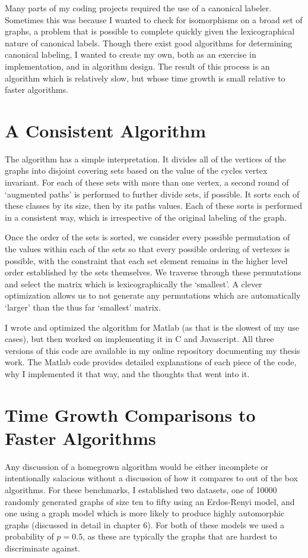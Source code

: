 \documentclass[11pt,a4paper]{report}
\begin{document}
Many parts of my coding projects required the use of a canonical labeler.
Sometimes this was because I wanted to check for isomorphisms on a broad set of graphs, a problem that is possible to complete quickly given the lexicographical nature of canonical labels.
Though there exist good algorithms for determining canonical labeling, I wanted to create my own, both as an exercise in implementation, and in algorithm design.
The result of this process is an algorithm which is relatively slow, but whose time growth is small relative to faster algorithms.

\section{A Consistent Algorithm}
The algorithm has a simple interpretation. 
It divides all of the vertices of the graphs into disjoint covering sets based on the value of the cycles vertex invariant.
For each of these sets with more than one vertex, a second round of `augmented paths' is performed to further divide sets, if possible.
It sorts each of these classes by its size, then by its paths values.
Each of these sorts is performed in a consistent way, which is irrespective of the original labeling of the graph.

Once the order of the sets is sorted, we consider every possible permutation of the values within each of the sets so that every possible ordering of vertexes is possible, with the constraint that each set element remains in the higher level order established by the sets themselves.
We traverse through these permutations and select the matrix which is lexicographically the `smallest'.
A clever optimization allows us to not generate any permutations which are automatically `larger' than the thus far `smallest' matrix.

I wrote and optimized the algorithm for Matlab (as that is the slowest of my use cases), but then worked on implementing it in C and Javascript.
All three versions of this code are available in my online repository documenting my thesis work.
The Matlab code provides detailed explanations of each piece of the code, why I implemented it that way, and the thoughts that went into it.

\section{Time Growth Comparisons to Faster Algorithms}
Any discussion of a homegrown algorithm would be either incomplete or intentionally salacious without a discussion of how it compares to out of the box algorithms.
For these benchmarks, I established two datasets, one of 10000 randomly generated graphs of size ten to fifty using an Erdos-Renyi model, and one using a graph model which is more likely to produce highly automorphic graphs (discussed in detail in chapter 6).
For both of these models we used a probability of $p=0.5$, as these are typically the graphs that are hardest to discriminate against.
\end{document}
